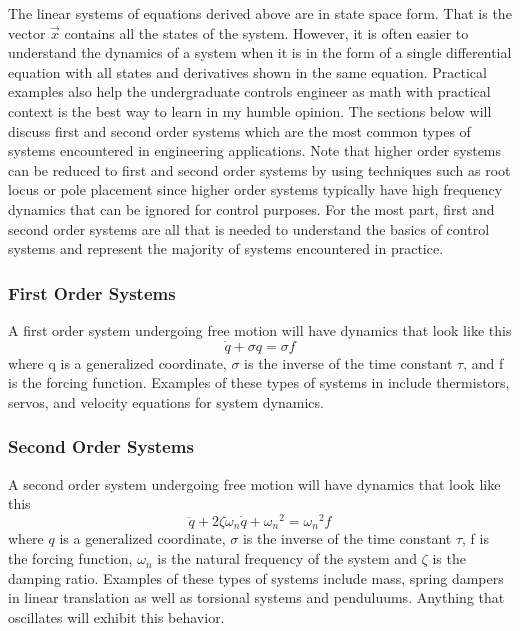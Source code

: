 The linear systems of equations derived above are in state space form. That is the vector $\vec{x}$ contains all the states of the system. However, it is often easier to understand the dynamics of a system when it is in the form of a single differential equation with all states and derivatives shown in the same equation. Practical examples also help the undergraduate controls engineer as math with practical context is the best way to learn in my humble opinion. The sections below will discuss first and second order systems which are the most common types of systems encountered in engineering applications. Note that higher order systems can be reduced to first and second order systems by using techniques such as root locus or pole placement since higher order systems typically have high frequency dynamics that can be ignored for control purposes. For the most part, first and second order systems are all that is needed to understand the basics of control systems and represent the majority of systems encountered in practice.

\subsubsection{First Order Systems}

A first order system undergoing free motion will have dynamics that look like this
\begin{equation} \label{e:first_order}
\dot{q} + \sigma q = \sigma f
\end{equation}
\noindent where q is a generalized coordinate, $\sigma$ is the inverse of the time constant $\tau$, and f is the forcing function. Examples of these types of systems in include thermistors, servos, and velocity equations for system dynamics. 

\subsubsection{Second Order Systems}

A second order system undergoing free motion will have dynamics that look like this
\begin{equation}\label{e:second_order}
\ddot{q} + 2\zeta \omega_n \dot{q} + {\omega_n}^2 = {\omega_n}^2 f
\end{equation}
where $q$ is a generalized coordinate, $\sigma$ is the inverse of the time constant $\tau$, f is the forcing function, $\omega_n$ is the natural frequency of the system and $\zeta$ is the damping ratio. Examples of these types of systems include mass, spring dampers in linear translation as well as torsional systems and penduluums. Anything that oscillates will exhibit this behavior. 


